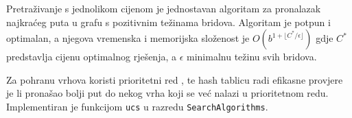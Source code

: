 Pretraživanje s jednolikom cijenom  je jednostavan algoritam za pronalazak najkraćeg puta u grafu s pozitivnim težinama bridova.
Algoritam je potpun i optimalan, a njegova vremenska i memorijska složenost je \( O \left (b^{1 + \lfloor {C^*}/{\epsilon} \rfloor} \right ) \) gdje \( C^* \) predstavlja cijenu optimalnog rješenja, a \( \epsilon \) minimalnu težinu svih bridova.

Za pohranu vrhova koristi prioritetni red , te hash tablicu radi efikasne provjere je li pronašao bolji put do nekog vrha koji se već nalazi u prioritetnom redu. Implementiran je funkcijom \texttt{ucs} u razredu \texttt{SearchAlgorithms}.
